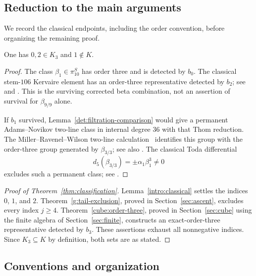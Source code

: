 \subsection{Reduction to the main arguments}

We record the classical endpoints, including the order convention, before organizing the remaining proof.

\begin{lemma}\label{intro:classical}
One has $0,2\in K_3$ and $1\notin K$.
\end{lemma}

\begin{proof}
The class $\beta_1\in\pi^S_{10}$ has order three and is detected by $b_0$. The classical stem-$106$ Kervaire element has an order-three representative detected by $b_2$; see \cite[Theorem~3.4.4(c), discussion after Proposition~6.4.11, and Table~A3.4]{Ravenel} and \cite[Theorem~1.1 and Corollary~1.2]{Amelotte}. This is the surviving corrected beta combination, not an assertion of survival for $\beta_{9/9}$ alone.

If $b_1$ survived, Lemma~\ref{det:filtration-comparison} would give a permanent Adams--Novikov two-line class in internal degree $36$ with that Thom reduction. The Miller--Ravenel--Wilson two-line calculation~\cite[Theorem~2.6]{MRW} identifies this group with the order-three group generated by $\beta_{3/3}$; see also \cite[Lemma~6.4.12(i)]{Ravenel}. The classical Toda differential
\[
 d_5(\beta_{3/3})=\pm\alpha_1\beta_1^3\neq0
\]
excludes such a permanent class; see \cite[Lemma~2.5]{BelmontShimomura}.
\end{proof}

\begin{proof}[Proof of Theorem~\ref{thm:classification}]
Lemma~\ref{intro:classical} settles the indices $0$, $1$, and $2$. Theorem~\ref{g:tail-exclusion}, proved in Section~\ref{sec:ascent}, excludes every index $j\geq4$. Theorem~\ref{cube:order-three}, proved in Section~\ref{sec:cube} using the finite algebra of Section~\ref{sec:finite}, constructs an exact-order-three representative detected by $b_3$. These assertions exhaust all nonnegative indices. Since $K_3\subseteq K$ by definition, both sets are as stated.
\end{proof}

\subsection{Conventions and organization}

